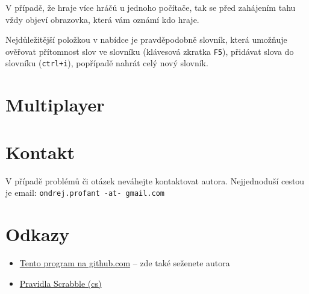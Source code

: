 \documentclass[a4paper]{article}
\begin{document}
V případě, že hraje více hráčů u jednoho počítače, tak se před zahájením tahu vždy objeví obrazovka, která vám oznámí kdo hraje.

Nejdůležitější položkou v nabídce je pravděpodobně slovník, která umožňuje ověřovat přítomnost slov ve slovníku (klávesová zkratka \texttt{F5}), přidávat slova do slovníku (\texttt{ctrl+i}), popřípadě nahrát celý nový slovník.

\section{Multiplayer}
\section{Kontakt}
V případě problémů či otázek neváhejte kontaktovat autora. Nejjednoduší cestou je email: \texttt{ondrej.profant -at- gmail.com}
\section{Odkazy}
\begin{itemize}
\item \href{http://github.com/Kedrigern/scrabble}{Tento program na github.com} -- zde také seženete autora
\item \href{http://scrabble.hrejsi.cz/pravidla/}{Pravidla Scrabble (cs)}
\end{itemize}
\end{document}
